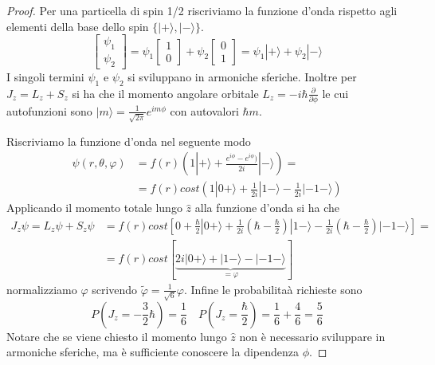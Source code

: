 \begin{proof}
	Per una particella di spin 1/2 riscriviamo la funzione d'onda rispetto agli elementi della base dello spin $\{|+\rangle,|- \rangle \}$.
	\begin{equation*}
		\left[\begin{array}{l}
			\psi_1 \\ \psi_2
		\end{array}\right] = \psi_1 \left[\begin{array}{l} 1 \\ 0 
		\end{array}\right] +\psi_2\left[\begin{array}{l} 0 \\ 1 
		\end{array}\right] = \psi_1|+\rangle + \psi_2 |-\rangle 
	\end{equation*}
I singoli termini $\psi_1$ e $\psi_2$ si sviluppano in armoniche sferiche. Inoltre per $J_z = L_z + S_z$ si ha che  il momento angolare orbitale $L_z = - i \hbar \frac{\partial}{\partial \phi}$  le cui autofunzioni sono $|m\rangle =\frac{1}{\sqrt{2 \pi}}e^{im\phi}$  con autovalori $\hbar m$.
\newpage

Riscriviamo la funzione d'onda nel seguente modo
\begin{align*}
	\psi(r,\theta,\varphi) & = f(r) \left(1|+\rangle + \frac{e^{i\phi}-e^{i\phi})}{2i}|-\rangle\right) = \\[0.5cm]
	& = f(r)cost \left(1|0+\rangle + \frac{1}{2i}|1-\rangle - \frac{1}{2i}|-1-\rangle \right)
\end{align*}
Applicando il momento totale lungo $\hat{z}$ alla funzione d'onda si ha che
\begin{align*}
	J_z \psi = L_z \psi +S_z\psi & = f(r)cost \left[0 + \frac{\hbar}{2}|0+\rangle + \frac{1}{2i}\left(\hbar - \frac{\hbar}{2}\right)|1-\rangle - \frac{1}{2i}\left(\hbar - \frac{\hbar}{2}\right)|-1-\rangle \right] = \\[0.5cm]
	& = f(r)cost \left[\underbrace{2i|0+\rangle + |1-\rangle - |-1-\rangle}_{= \varphi} \right]
\end{align*} 
normalizziamo $\varphi $ scrivendo $\tilde{\varphi} = \frac{1}{\sqrt{6}}\varphi$. Infine le probabilita\`a richieste sono
\begin{equation*}
	P\left(J_z = -\frac{3}{2}\hbar \right) = \frac{1}{6} \quad P \left(J_z = \frac{\hbar}{2}\right) = \frac{1}{6} + \frac{4}{6} = \frac{5}{6}
\end{equation*}
Notare che se viene chiesto il momento lungo $\hat{z}$ non \`e necessario sviluppare in armoniche sferiche, ma \`e sufficiente conoscere la dipendenza $\phi$.
	
\end{proof}

